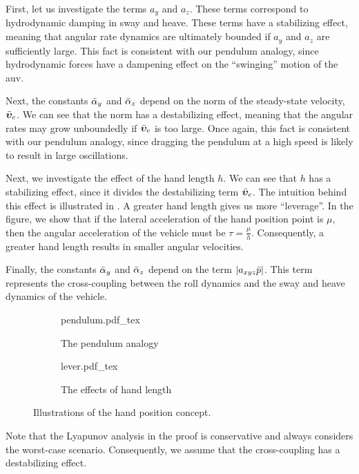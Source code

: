 First, let us investigate the terms $a_y$ and $a_z$.
These terms correspond to hydrodynamic damping in sway and heave.
These terms have a stabilizing effect, meaning that angular rate dynamics are ultimately bounded if $a_y$ and $a_z$ are sufficiently large.
This fact is consistent with our pendulum analogy, since hydrodynamic forces have a dampening effect on the ``swinging'' motion of the \gls{auv}.

Next, the constants $\Bar{\alpha}_y$ and $\Bar{\alpha}_z$ depend on the norm of the steady-state velocity, $\Bar{\bm{\upsilon}}_e$.
We can see that the norm has a destabilizing effect, meaning that the angular rates may grow unboundedly if $\Bar{\bm{\upsilon}}_e$ is too large.
Once again, this fact is consistent with our pendulum analogy, since dragging the pendulum at a high speed is likely to result in large oscillations.

Next, we investigate the effect of the hand length $h$.
We can see that $h$ has a stabilizing effect, since it divides the destabilizing term $\Bar{\bm{\upsilon}}_e$.
The intuition behind this effect is illustrated in .
A greater hand length gives us more ``leverage''.
In the figure, we show that if the lateral acceleration of the hand position point is $\mu$, then the angular acceleration of the vehicle must be $\tau = \frac{\mu}{h}$.
Consequently, a greater hand length results in smaller angular velocities.

Finally, the constants $\Bar{\alpha}_y$ and $\Bar{\alpha}_z$ depend on the term $\left|a_{xyz}\Bar{p}\right|$.
This term represents the cross-coupling between the roll dynamics and the sway and heave dynamics of the vehicle.
\begin{figure}[h]
    \centering
    \begin{subfigure}{0.45\textwidth}    
        \centering
        \def\svgwidth{\textwidth}
        {pendulum.pdf_tex}
        \caption{The pendulum analogy}
        \label{fig:handpos_def_pendulum}
    \end{subfigure}
    \begin{subfigure}{0.45\textwidth}    
        \centering
        \def\svgwidth{\textwidth}
        {lever.pdf_tex}
        \caption{The effects of hand length}
        \label{fig:handpos_def_lever}
    \end{subfigure}
    \caption{Illustrations of the hand position concept.}
\end{figure}
Note that the Lyapunov analysis in the proof is conservative and always considers the worst-case scenario.
Consequently, we assume that the cross-coupling has a destabilizing effect.

